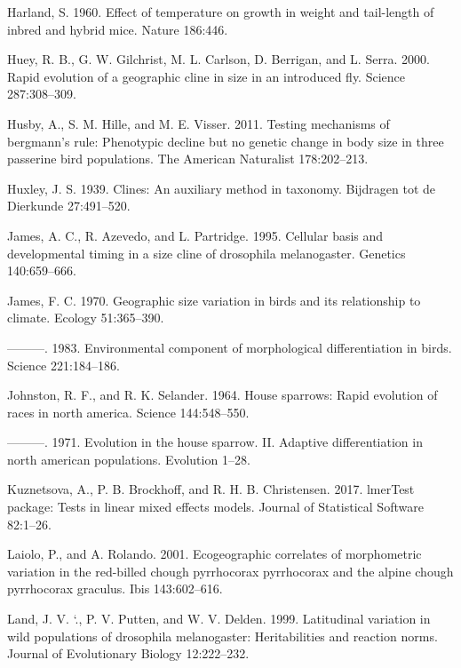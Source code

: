 \documentclass[]{article}
\begin{document}
\leavevmode\hypertarget{ref-Harland1960}{}%
Harland, S. 1960. Effect of temperature on growth in weight and
tail-length of inbred and hybrid mice. Nature 186:446.

\leavevmode\hypertarget{ref-Huey2000}{}%
Huey, R. B., G. W. Gilchrist, M. L. Carlson, D. Berrigan, and L. Serra.
2000. Rapid evolution of a geographic cline in size in an introduced
fly. Science 287:308--309.

\leavevmode\hypertarget{ref-Husby2011}{}%
Husby, A., S. M. Hille, and M. E. Visser. 2011. Testing mechanisms of
bergmann's rule: Phenotypic decline but no genetic change in body size
in three passerine bird populations. The American Naturalist
178:202--213.

\leavevmode\hypertarget{ref-Huxley1939}{}%
Huxley, J. S. 1939. Clines: An auxiliary method in taxonomy. Bijdragen
tot de Dierkunde 27:491--520.

\leavevmode\hypertarget{ref-James1995}{}%
James, A. C., R. Azevedo, and L. Partridge. 1995. Cellular basis and
developmental timing in a size cline of drosophila melanogaster.
Genetics 140:659--666.

\leavevmode\hypertarget{ref-James1970}{}%
James, F. C. 1970. Geographic size variation in birds and its
relationship to climate. Ecology 51:365--390.

\leavevmode\hypertarget{ref-James1983}{}%
---------. 1983. Environmental component of morphological
differentiation in birds. Science 221:184--186.

\leavevmode\hypertarget{ref-Johnston1964}{}%
Johnston, R. F., and R. K. Selander. 1964. House sparrows: Rapid
evolution of races in north america. Science 144:548--550.

\leavevmode\hypertarget{ref-Johnston1971}{}%
---------. 1971. Evolution in the house sparrow. II. Adaptive
differentiation in north american populations. Evolution 1--28.

\leavevmode\hypertarget{ref-Kuznetsova2017}{}%
Kuznetsova, A., P. B. Brockhoff, and R. H. B. Christensen. 2017.
lmerTest package: Tests in linear mixed effects models. Journal of
Statistical Software 82:1--26.

\leavevmode\hypertarget{ref-Laiolo2001}{}%
Laiolo, P., and A. Rolando. 2001. Ecogeographic correlates of
morphometric variation in the red-billed chough pyrrhocorax pyrrhocorax
and the alpine chough pyrrhocorax graculus. Ibis 143:602--616.

\leavevmode\hypertarget{ref-Land1999}{}%
Land, J. V. `., P. V. Putten, and W. V. Delden. 1999. Latitudinal
variation in wild populations of drosophila melanogaster: Heritabilities
and reaction norms. Journal of Evolutionary Biology 12:222--232.
\end{document}
